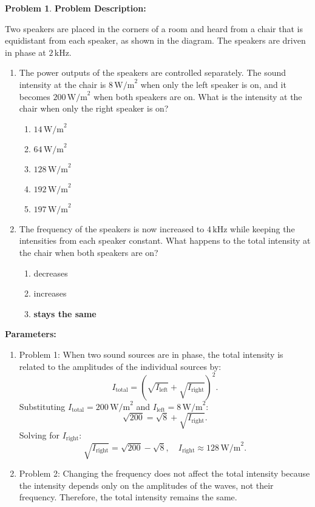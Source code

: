 \documentclass[12pt]{article}
\theoremstyle{definition} %
\newtheorem{problem}{Problem}
\theoremstyle{plain} %
\begin{document}
\begin{problem}
    \textbf{Problem Description:}

Two speakers are placed in the corners of a room and heard from a chair that is equidistant from each speaker, as shown in the diagram. The speakers are driven in phase at \(2 \, \text{kHz}\).

\begin{enumerate}
    \item[1.] The power outputs of the speakers are controlled separately. The sound intensity at the chair is \(8 \, \text{W/m}^2\) when only the left speaker is on, and it becomes \(200 \, \text{W/m}^2\) when both speakers are on. What is the intensity at the chair when only the right speaker is on?
    \begin{enumerate}
        \item \(14 \, \text{W/m}^2\)
        \item \(64 \, \text{W/m}^2\)
        \item \textbf{\(128 \, \text{W/m}^2\)}
        \item \(192 \, \text{W/m}^2\)
        \item \(197 \, \text{W/m}^2\)
    \end{enumerate}

    \item[2.] The frequency of the speakers is now increased to \(4 \, \text{kHz}\) while keeping the intensities from each speaker constant. What happens to the total intensity at the chair when both speakers are on?
    \begin{enumerate}
        \item decreases
        \item increases
        \item \textbf{stays the same}
    \end{enumerate}
\end{enumerate}

\textbf{Parameters:}
\begin{enumerate}
    \item Problem 1: When two sound sources are in phase, the total intensity is related to the amplitudes of the individual sources by:
    $$
    I_{\text{total}} = \left( \sqrt{I_{\text{left}}} + \sqrt{I_{\text{right}}} \right)^2.
    $$
    Substituting \(I_{\text{total}} = 200 \, \text{W/m}^2\) and \(I_{\text{left}} = 8 \, \text{W/m}^2\):
    $$
    \sqrt{200} = \sqrt{8} + \sqrt{I_{\text{right}}}.
    $$
    Solving for \(I_{\text{right}}\):
    $$
    \sqrt{I_{\text{right}}} = \sqrt{200} - \sqrt{8}, \quad I_{\text{right}} \approx 128 \, \text{W/m}^2.
    $$
    \item Problem 2: Changing the frequency does not affect the total intensity because the intensity depends only on the amplitudes of the waves, not their frequency. Therefore, the total intensity remains the same.
\end{enumerate}


\end{problem}
\end{document}
